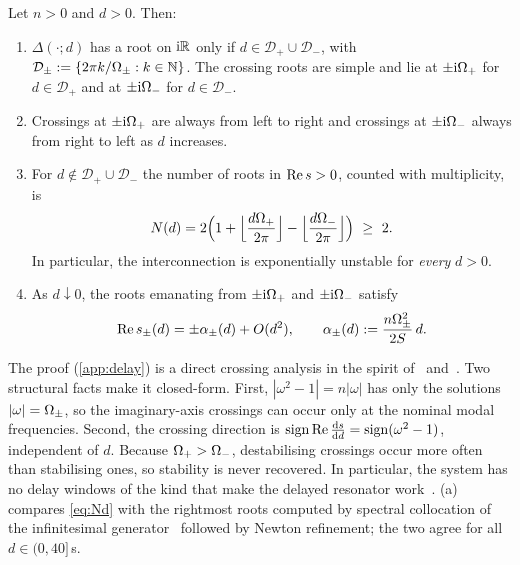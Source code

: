 \begin{theorem}\label{thm:delay}
Let $n>0$ and $d>0$. Then:
\begin{enumerate}
\item[(a)] $\Delta(\cdot;d)$ has a root on $\mathrm{i}\mathbb{R}$ only if $d\in\mathcal
  D_+\cup\mathcal D_-$, with $\mathcal D_\pm:=\{2\pi k/\Omega_\pm:k\in\mathbb{N}\}$.
  The crossing roots are simple and lie at $\pm\mathrm{i}\Omega_+$ for $d\in\mathcal D_+$
  and at $\pm\mathrm{i}\Omega_-$ for $d\in\mathcal D_-$.
\item[(b)] Crossings at $\pm\mathrm{i}\Omega_+$ are always from left to right and crossings
  at $\pm\mathrm{i}\Omega_-$ always from right to left as $d$ increases.
\item[(c)] For $d\notin\mathcal D_+\cup\mathcal D_-$ the number of roots in
  $\operatorname{Re} s>0$, counted with multiplicity, is
  \begin{equation}\label{eq:Nd}
    N(d)=2\Big(1+\Big\lfloor\frac{d\Op}{2\pi}\Big\rfloor-\Big\lfloor\frac{d\Om}{2\pi}\Big\rfloor\Big)\ \ge\ 2.
  \end{equation}
  In particular, the interconnection is exponentially unstable for \emph{every}
  $d>0$.
\item[(d)] As $d\downarrow0$, the roots emanating from $\pm\mathrm{i}\Omega_+$ and
  $\pm\mathrm{i}\Omega_-$ satisfy
  \begin{equation}\label{eq:delay-rates}
    \operatorname{Re} s_\pm(d)=\pm\alpha_\pm(d)+O(d^2),\qquad
    \alpha_\pm(d):=\frac{n\Omega_\pm^2}{2S}\,d.
  \end{equation}
\end{enumerate}
\end{theorem}

The proof (\cref{app:delay}) is a direct crossing analysis in the spirit
of~\citet{cooke1986zeroes} and~\citet{walton1987direct}.
Two structural facts make it closed-form.
First, $|\omega^2-1|=n|\omega|$ has only the solutions $|\omega|=\Omega_\pm$, so the
imaginary-axis crossings can occur only at the nominal modal frequencies.
Second, the crossing direction is $\operatorname{sign}\operatorname{Re}\frac{\mathrm{d} s}{\mathrm{d} d}=\operatorname{sign}(\omega^2-1)$,
independent of $d$.
Because $\Omega_+>\Omega_-$, destabilising crossings occur more often than stabilising
ones, so stability is never recovered.
In particular, the system has no delay windows of the kind that make the delayed
resonator work~\citep{olgac1994novel}.
(a) compares \eqref{eq:Nd} with the rightmost roots computed by
spectral collocation of the infinitesimal generator~\citep{breda2005pseudospectral}
followed by Newton refinement; the two agree for all $d\in(0,40]$\,s.

